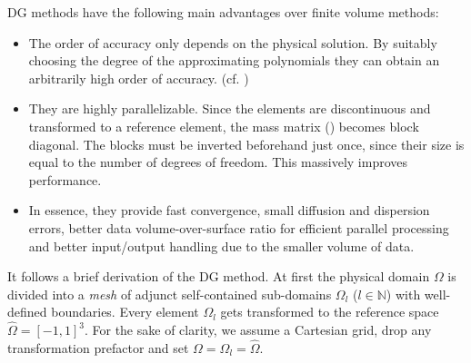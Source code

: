 DG methods have the following main advantages over finite volume methods:
\begin{itemize}
\item The order of accuracy only depends on the physical solution. By suitably
choosing the degree of the approximating polynomials they can obtain an
arbitrarily high order of accuracy. (cf. \cite{yu2013accuracy})

\item They are highly parallelizable. Since the elements are discontinuous and
transformed to a reference element, the mass matrix () becomes
block diagonal. The blocks must be inverted beforehand just once, since their
size is equal to the number of degrees of freedom. This massively improves
performance.



\item In essence, they provide fast convergence, small diffusion and dispersion
errors, better data volume-over-surface ratio for efficient parallel processing
and better input/output handling due to the smaller volume of data.
\end{itemize}


It follows a brief derivation of the DG method.  At first the physical domain
$\Omega$ is divided into a \emph{mesh} of adjunct self-contained sub-domains
$\Omega_l$ ($l \in \mathbb{N}$) with well-defined boundaries. Every
element $\Omega_l$ gets transformed to the reference space $\hat{\Omega} =
[-1,1]^3$. For the sake of clarity, we assume a Cartesian grid, drop any
transformation prefactor and set $\Omega = \Omega_l = \hat{\Omega}$.

